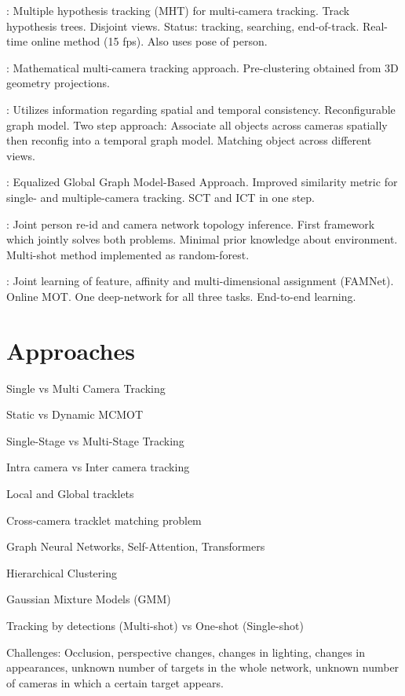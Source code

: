 \cite{Yoon18}: Multiple hypothesis tracking (MHT) for multi-camera tracking. Track hypothesis trees. Disjoint views. Status: tracking, searching, end-of-track. Real-time online method (15 fps). Also uses pose of person.

\cite{Nguyen22a}: Mathematical multi-camera tracking approach. Pre-clustering obtained from 3D geometry projections.

\cite{Cheng23}: Utilizes information regarding spatial and temporal consistency. Reconfigurable graph model. Two step approach: Associate all objects across cameras spatially then reconfig into a temporal graph model. Matching object across different views.

\cite{Chen17a}: Equalized Global Graph Model-Based Approach. Improved similarity metric for single- and multiple-camera tracking. SCT and ICT in one step.

\cite{Cho19}: Joint person re-id and camera network topology inference. First framework which jointly solves both problems. Minimal prior knowledge about environment. Multi-shot method implemented as random-forest.

\cite{Chu19}: Joint learning of feature, affinity and multi-dimensional assignment (FAMNet). Online MOT. One deep-network for all three tasks. End-to-end learning.

\section{Approaches}

Single vs Multi Camera Tracking

Static vs Dynamic MCMOT

Single-Stage vs Multi-Stage Tracking

Intra camera vs Inter camera tracking

Local and Global tracklets

Cross-camera tracklet matching problem

Graph Neural Networks, Self-Attention, Transformers

Hierarchical Clustering

Gaussian Mixture Models (GMM)

Tracking by detections (Multi-shot) vs One-shot (Single-shot)

Challenges: Occlusion, perspective changes, changes in lighting, changes in appearances, unknown number of targets in the whole network, unknown number of cameras in which a certain target appears.

